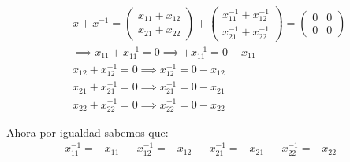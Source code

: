 \begin{exercise}[Sea $x\in M_{2\times 2}(\R)x^{-1}$ denotado así el inverso aditivo, tal que $x^{-1}\in M_{2\times 2}(\R)$ que cumple con la propiedad de que: $x+x^{-1}=\bar{0}$]
	\begin{align*}
		 & x+x^{-1}=\begin{pmatrix}
			            x_{11}+x_{12} \\x_{21}+x_{22}
		            \end{pmatrix}+\begin{pmatrix}
			                          x^{-1}_{11}+x^{-1}_{12} \\x^{-1}_{21}+x^{-1}_{22}
		                          \end{pmatrix}=\begin{pmatrix}
			                                        0 & 0 \\0&0
		                                        \end{pmatrix} \\
		 & \implies x_{11}+x^{-1}_{11}=0 \implies +x^{-1}_{11}=0-x_{11}            \\
		 & x_{12}+x^{-1}_{12}=0\implies x^{-1}_{12}=0-x_{12}                       \\
		 & x_{21}+x^{-1}_{21}=0\implies x^{-1}_{21}=0-x_{21}                       \\
		 & x_{22}+x^{-1}_{22}=0\implies x^{-1}_{22}=0-x_{22}
	\end{align*}

	Ahora por igualdad sabemos que:
	\begin{align*}
		                    & x^{-1}_{11}=-x_{11} &   &
		x^{-1}_{12}=-x_{12} &                     &
		x^{-1}_{21}=-x_{21} &                     &
		x^{-1}_{22}=-x_{22} &                     &
	\end{align*}


\end{exercise}
